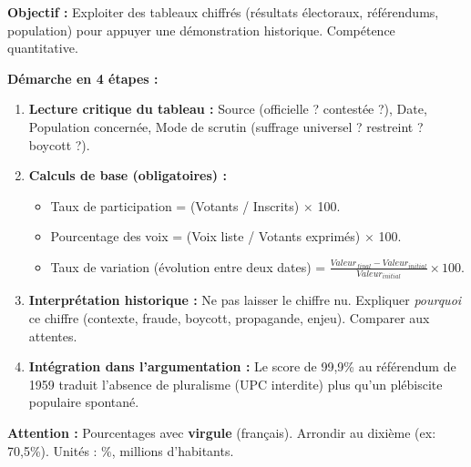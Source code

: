 \documentclass[11pt]{article}
\newcommand{\cle}[1]{{\popxbold\color{popdark}#1}}
\begin{document}
\begin{methode}
\textbf{Objectif :} Exploiter des tableaux chiffrés (résultats électoraux, référendums, population) pour appuyer une démonstration historique. Compétence quantitative.\par
\textbf{Démarche en 4 étapes :}
\begin{enumerate}
    \item \textbf{Lecture critique du tableau :} Source (officielle ? contestée ?), Date, Population concernée, Mode de scrutin (suffrage universel ? restreint ? boycott ?).
    \item \textbf{Calculs de base (obligatoires) :}
        \begin{itemize}
            \item \cle{Taux de participation} = (Votants / Inscrits) $\times$ 100.
            \item \cle{Pourcentage des voix} = (Voix liste / Votants exprimés) $\times$ 100.
            \item \cle{Taux de variation} (évolution entre deux dates) = $\frac{Valeur_{final} - Valeur_{initial}}{Valeur_{initial}} \times 100$.
        \end{itemize}
    \item \textbf{Interprétation historique :} Ne pas laisser le chiffre nu. Expliquer \emph{pourquoi} ce chiffre (contexte, fraude, boycott, propagande, enjeu). Comparer aux attentes.
    \item \textbf{Intégration dans l'argumentation :} \guillemotleft Le score de 99,9\% au référendum de 1959 traduit l'absence de pluralisme (UPC interdite) plus qu'un plébiscite populaire spontané. \guillemotright
\end{enumerate}
\textbf{Attention :} Pourcentages avec \textbf{virgule} (français). Arrondir au dixième (ex: 70,5\%). Unités : \%, millions d'habitants.
\end{methode}
\end{document}
